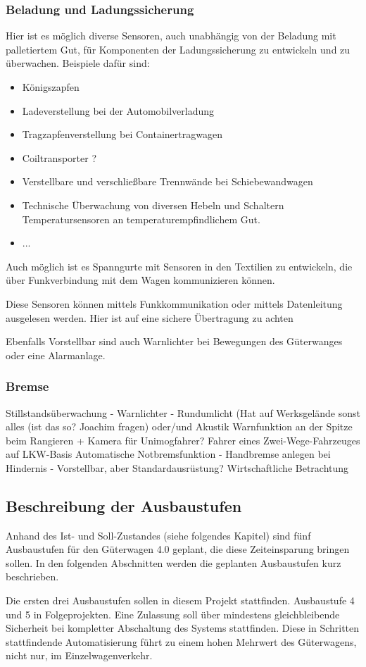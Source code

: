 \subsubsection{Beladung und Ladungssicherung}
Hier ist es möglich diverse Sensoren, auch unabhängig von der Beladung mit palletiertem Gut, für Komponenten der Ladungssicherung zu entwickeln und zu überwachen. Beispiele dafür sind:
\begin{itemize}
    \item Königszapfen
    \item Ladeverstellung bei der Automobilverladung
    \item Tragzapfenverstellung bei Containertragwagen
    \item Coiltransporter ?
    \item Verstellbare und verschließbare Trennwände bei Schiebewandwagen
    \item Technische Überwachung von diversen Hebeln und Schaltern
    \itemm Temperatursensoren an temperaturempfindlichem Gut.
    \item ...
\end{itemize}
Auch möglich ist es Spanngurte mit Sensoren in den Textilien zu entwickeln, die über Funkverbindung mit dem Wagen kommunizieren können.\par
Diese Sensoren können mittels Funkkommunikation oder mittels Datenleitung ausgelesen werden. Hier ist auf eine sichere Übertragung zu achten\par
Ebenfalls Vorstellbar sind auch Warnlichter bei Bewegungen des Güterwanges oder eine Alarmanlage.
\subsubsection{Bremse}
Stillstandsüberwachung - Warnlichter - Rundumlicht (Hat auf Werksgelände sonst alles (ist das so? Joachim fragen) oder/und Akustik
Warnfunktion an der Spitze beim Rangieren + Kamera für Unimogfahrer? Fahrer eines Zwei-Wege-Fahrzeuges auf LKW-Basis
Automatische Notbremsfunktion - Handbremse anlegen bei Hindernis - Vorstellbar, aber Standardausrüstung? Wirtschaftliche Betrachtung


\subsection{Beschreibung der Ausbaustufen}\label{sec:Ausbaustufen}
Anhand des Ist- und Soll-Zustandes (siehe folgendes Kapitel) sind fünf Ausbaustufen für den Güterwagen 4.0 geplant, die diese Zeiteinsparung bringen sollen. In den folgenden Abschnitten werden die geplanten Ausbaustufen kurz beschrieben.\par
Die ersten drei Ausbaustufen sollen in diesem Projekt stattfinden. Ausbaustufe 4 und 5 in Folgeprojekten. Eine Zulassung soll über mindestens gleichbleibende Sicherheit bei kompletter Abschaltung des Systems stattfinden. Diese in Schritten stattfindende Automatisierung führt zu einem hohen Mehrwert des Güterwagens, nicht nur, im Einzelwagenverkehr.
